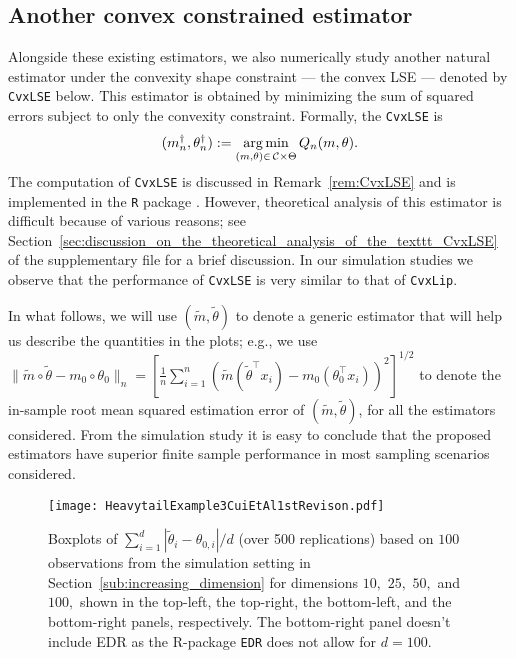 {\subsection{Another convex constrained estimator}
Alongside these existing estimators, we also numerically study  another natural estimator under the convexity shape constraint --- the convex LSE --- denoted by \texttt{CvxLSE} below. This estimator is obtained by minimizing the sum of squared errors  subject to only the convexity constraint. Formally, the \texttt{CvxLSE} is
\begin{equation} \label{eq:ultimate_est}
(m^\dagger_n, \theta^\dagger_n):= \operatorname*{arg\,min}_{(m, \theta)\in\, \mathcal{C}\times\Theta} Q_n(m, \theta).
\end{equation}
{The computation of \texttt{CvxLSE} is discussed in Remark~\ref{rem:CvxLSE} and is implemented in the \texttt{R} package  \fi  {}\blind{\texttt{***}}\fi. }However, theoretical analysis of this estimator is difficult because of various reasons; see Section~\ref{sec:discussion_on_the_theoretical_analysis_of_the_texttt_CvxLSE} of the supplementary file for a brief discussion. %
In our simulation studies we observe that the performance of  \texttt{CvxLSE} is very similar to that of \texttt{CvxLip}.

In what follows, we will use $(\tilde{m},\tilde{\theta})$ to denote a generic estimator that will help us describe the quantities in the plots; e.g., we use $ \|\tilde{m}\circ \tilde{\theta}-m_0\circ\theta_0\|_n =[\frac{1}{n}\sum_{i=1}^n (\tilde{m}( \tilde{\theta}^\top x_i)-m_0(\theta_0^\top x_i))^2]^{1/2}$ to denote the in-sample root mean squared estimation error of $(\tilde{m},\tilde{\theta})$, for all the estimators considered. From the simulation study it is easy to conclude that the proposed estimators have superior finite sample performance in most sampling scenarios considered.

\begin{figure}[!ht]
\centering
\texttt{[image: HeavytailExample3CuiEtAl1stRevison.pdf]}\\ [-2ex]%
\caption{Boxplots of $\sum_{i=1}^d |\tilde{\theta}_i-\theta_{0,i}|/d$ (over 500 replications) based on $100$ observations from the simulation setting in Section~\ref{sub:increasing_dimension} for dimensions $10,$ $25,$ $50,$ and $100,$ shown in the top-left, the top-right, the bottom-left, and the bottom-right panels, respectively. The bottom-right panel doesn't include EDR as the R-package \texttt{EDR} does not allow for $d=100.$}
\label{fig:Ex3Cuietal_homo}
\end{figure}





}
